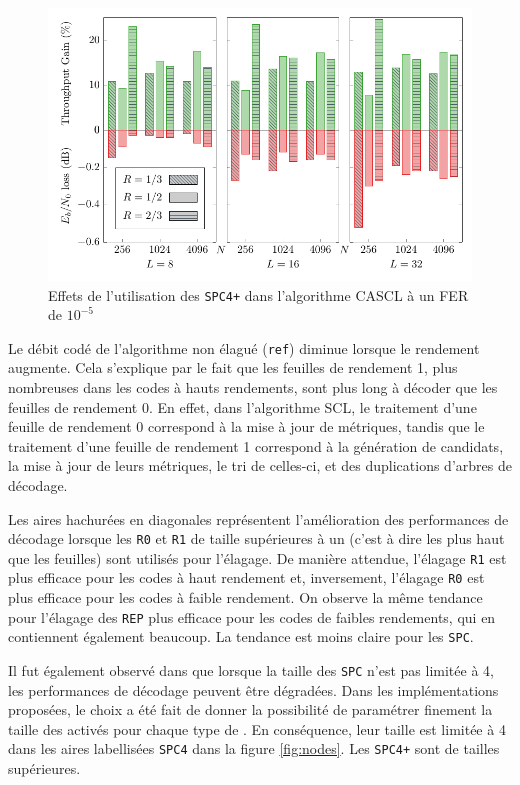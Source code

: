 \begin{figure}[t]
\includegraphics[width=\textwidth]{main/ch2_fig/curves/thr_spc/tikz/thr_spc_diff}
\caption{Effets de l'utilisation des \noeuds \texttt{SPC4+} dans l'algorithme CASCL à un FER de $10^{-5}$}
\label{fig:spc_impact}
\end{figure}

Le débit codé de l'algorithme non élagué (\texttt{ref}) diminue lorsque le rendement augmente. Cela s'explique par le fait que les feuilles de rendement 1, plus nombreuses dans les codes à hauts rendements, sont plus long à décoder que les feuilles de rendement 0. En effet, dans l'algorithme SCL, le traitement d'une feuille de rendement 0 correspond à la mise à jour de métriques, tandis que le traitement d'une feuille de rendement 1 correspond à la génération de candidats, la mise à jour de leurs métriques, le tri de celles-ci, et des duplications d'arbres de décodage.

Les aires hachurées en diagonales représentent l'amélioration des performances de décodage lorsque les \noeuds \texttt{R0} et \texttt{R1} de taille supérieures à un (c'est à dire les \noeuds plus haut que les feuilles) sont utilisés pour l'élagage. De manière attendue, l'élagage \texttt{R1} est plus efficace pour les codes à haut rendement et, inversement, l'élagage \texttt{R0} est plus efficace pour les codes à faible rendement. On observe la même tendance pour l'élagage des \noeuds \texttt{REP} plus efficace pour les codes de faibles rendements, qui en contiennent également beaucoup. La tendance est moins claire pour les \noeuds \texttt{SPC}.

Il fut également observé dans \cite{sarkis_fast_2014} que lorsque la taille des \noeuds \texttt{SPC} n'est pas limitée à 4, les performances de décodage peuvent être dégradées. Dans les implémentations proposées, le choix a été fait de donner la possibilité de paramétrer finement la taille des \noeuds activés pour chaque type de \noeuds. En conséquence, leur taille est limitée à 4 dans les aires labellisées \texttt{SPC4} dans la figure \ref{fig:nodes}. Les \noeuds \texttt{SPC4+} sont de tailles supérieures. 

